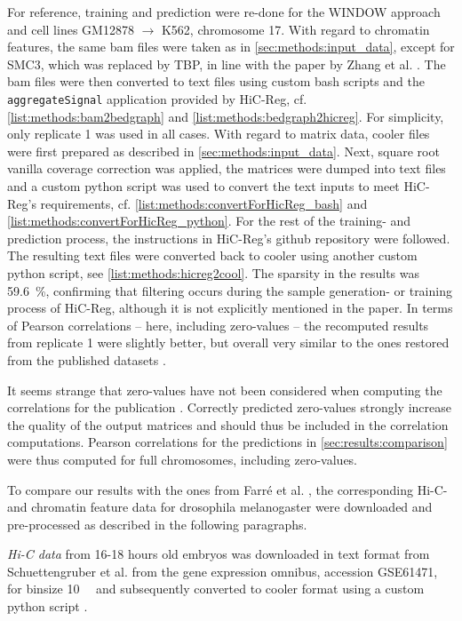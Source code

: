For reference, training and prediction were re-done for the WINDOW approach and cell lines GM12878 $\rightarrow$ K562, chromosome 17.
With regard to chromatin features, the same bam files were taken as in \cref{sec:methods:input_data}, except for SMC3, which was replaced by TBP,
in line with the paper by Zhang et al. \cite{Zhang2019}. 
The bam files were then converted to text files using custom bash scripts and the \texttt{aggregateSignal} application provided by HiC-Reg, 
cf. \cref{list:methods:bam2bedgraph} and \ref{list:methods:bedgraph2hicreg}. 
For simplicity, only replicate 1 was used in all cases.
With regard to matrix data, cooler files were first prepared as described in \cref{sec:methods:input_data}.
Next, square root vanilla coverage correction was applied, the matrices were dumped into text files and a custom python script was used
to convert the text inputs to meet HiC-Reg's requirements, cf. \cref{list:methods:convertForHicReg_bash} and \ref{list:methods:convertForHicReg_python}.
For the rest of the training- and prediction process, the instructions in HiC-Reg's github repository were followed.
The resulting text files were converted back to cooler using another custom python script, see \cref{list:methods:hicreg2cool}.
The sparsity in the results was \SI{59.6}{\percent}, confirming that filtering occurs during the sample generation- or training process of HiC-Reg,
although it is not explicitly mentioned in the paper.
In terms of Pearson correlations -- here, including zero-values -- the recomputed results from replicate 1 were slightly better,
but overall very similar to the ones restored from the published datasets \cite{ShiluZhang2019,ShiluZhang2019a}. 

It seems strange that zero-values have not been considered when computing the correlations for the publication \cite{Zhang2019}.
Correctly predicted zero-values strongly increase the quality of the output matrices 
and should thus be included in the correlation computations.
Pearson correlations for the predictions in \cref{sec:results:comparison} were thus computed for full chromosomes, including zero-values.

To compare our results with the ones from Farr\'e et al. \cite{Farre2018a},
the corresponding Hi-C- and chromatin feature data for drosophila melanogaster were downloaded and pre-processed as described in the following paragraphs.

\emph{Hi-C data} from 16-18 hours old embryos was downloaded in text format from Schuettengruber et al. \cite{Schuettengruber2014} 
from the gene expression omnibus, accession GSE61471, for binsize \SI{10}{\kilo\bp} and subsequently converted to cooler format using a custom python script \cite[scripts/schuettengruberToCooler.py]{Krauth2021b}.

